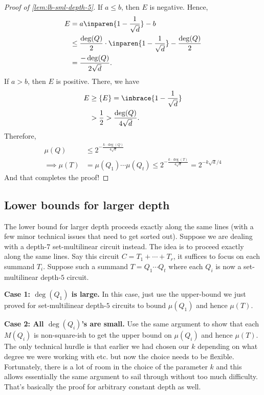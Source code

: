 \begin{proof}[Proof of \autoref{lem:lb-sml-depth-5}]
  \noindent
  If $a \leq b$, then $E$ is negative. Hence,
  \begin{align*}
    E & =  a\inparen{1 - \frac{1}{\sqrt{d}}} - b\\
      & \leq \frac{\deg(Q)}{2} \cdot \inparen{1 - \frac{1}{\sqrt{d}}} - \frac{\deg(Q)}{2}\\
      & = \frac{-\deg(Q)}{2\sqrt{d}}.
  \end{align*}
  If $a > b$, then $E$ is positive. There, we have
  \begin{align*}
    E & \geq \{E\} = \inbrace{1 - \frac{1}{\sqrt{d}}}\\
      & > \frac{1}{2} > \frac{\deg(Q)}{4\sqrt{d}}.
  \end{align*}
  Therefore,
  \begin{align*}
    \mu(Q) & \leq 2^{- \frac{k \cdot \deg(Q)}{4\sqrt{d}}}\\
    \implies \mu(T) & = \mu(Q_1)\cdots \mu(Q_t) \leq 2^{-\frac{k \cdot \deg(T)}{4\sqrt{d}}} = 2^{-k\sqrt{d}/4}
  \end{align*}
  And that completes the proof!  
\end{proof}


\subsection{Lower bounds for larger depth}

The lower bound for larger depth proceeds exactly along the same lines (with a few minor technical issues that need to get sorted out). Suppose we are dealing with a depth-$7$ set-multilinear circuit instead. The idea is to proceed exactly along the same lines. Say this circuit $C = T_1 + \cdots + T_r$, it suffices to focus on each summand $T_i$. Suppose such a summand $T = Q_1 \cdots Q_t$ where each $Q_i$ is now a set-multilinear depth-$5$ circuit.

{\bf Case 1: $\deg(Q_1)$ is large.} In this case, just use the upper-bound we just proved for set-multilinear depth-$5$ circuits to bound $\mu(Q_1)$ and hence $\mu(T)$.

\medskip

{\bf Case 2: All $\deg(Q_i)$'s are small.} Use the same argument to show that each $M(Q_i)$ is non-square-ish to get the upper bound on $\mu(Q_i)$ and hence $\mu(T)$.\\

The only technical hurdle is that earlier we had chosen our $k$ depending on what degree we were working with etc. but now the choice needs to be flexible. Fortunately, there is a lot of room in the choice of the parameter $k$ and this allows essentially the same argument to sail through without too much difficulty. That's basically the proof for arbitrary constant depth as well. 


